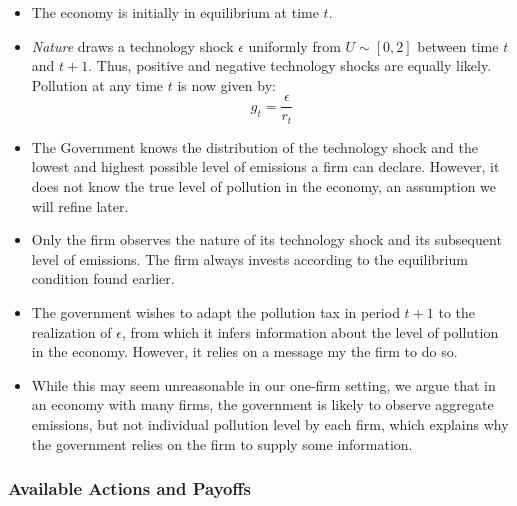 \documentclass{article}
\begin{document}
\begin{itemize}
    \item The economy is initially in equilibrium at time $t$.
    \item \textit{Nature} draws a technology shock $\epsilon$ uniformly from $U \sim [0,2]$ between time $t$ and $t+1$. Thus, positive and negative technology shocks are equally likely. Pollution at any time $t$ is now given by:
    \begin{equation}
        g_t = \frac{\epsilon}{r_t}
    \end{equation}
    \item The Government knows the distribution of the technology shock and the lowest and highest possible level of emissions a firm can declare. However, it does not know the true level of pollution in the economy, an assumption we will refine later. 
    \item Only the firm observes the nature of its technology shock and its subsequent level of emissions. The firm always invests according to the equilibrium condition found earlier.
    \item The government wishes to adapt the pollution tax in period $t+1$ to the realization of $\epsilon$, from which it infers information about the level of pollution in the economy. However, it relies on a message my the firm to do so. 
    \item While this may seem unreasonable in our one-firm setting, we argue that in an economy with many firms, the government is likely to observe aggregate emissions, but not individual pollution level by each firm, which explains why the government relies on the firm to supply some information.
\end{itemize} 

\subsubsection{Available Actions and Payoffs}
\end{document}
